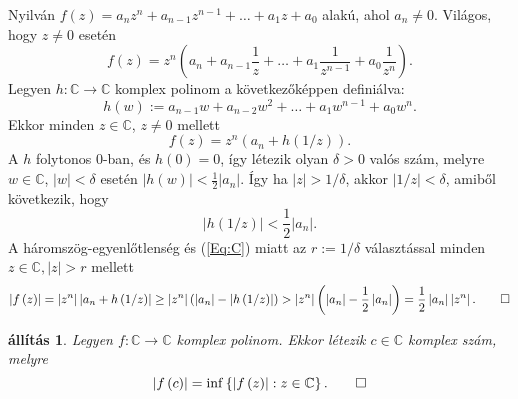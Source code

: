 \documentclass[9pt, showtrims]{memoir}
\makeatletter
\renewenvironment{proof}[1][\proofname]
    {\par\pushQED{\qed}%
    \normalfont \topsep6\p@\@plus6\p@\relax
    \trivlist
    \item[\hskip\labelsep
        \itshape
    #1\@addpunct{:}]\ignorespaces}
    {\popQED\endtrivlist\@endpefalse}
\theoremstyle{plain}
\newtheorem{proposition}{állítás}[section]
\theoremstyle{remark}
\theoremstyle{definition}
\makeatother
\begin{document}
\begin{proof}
Nyilván $f\left( z\right) =a_{n}z^{n}+a_{n-1}z^{n-1}+\ldots +a_{1}z+a_{0}
$ alakú, ahol $a_{n}\neq 0$.
Világos, hogy $z\neq 0$ esetén 
\[
f\left( z\right) =z^{n}\left( a_{n}+a_{n-1}\frac{1}{z}+\ldots +a_{1}\frac{1}{z^{n-1}}+a_{0}\frac{1}{z^{n}}\right) \text{.}
\]
Legyen $h:\mathbb{C}\rightarrow \mathbb{C}$ komplex polinom a következőképpen definiálva: 
\[
h\left( w\right) :=a_{n-1}w+a_{n-2}w^{2}+\ldots +a_{1}w^{n-1}+a_{0}w^{n}.
\]
Ekkor minden $z\in \mathbb{C}$, $z\neq 0$ mellett 
\begin{equation}
f\left( z\right) =z^{n}\left( a_{n}+h\left( 1/z\right) \right) .
\label{Eq:C}
\end{equation}
A $h$ folytonos $0$-ban, és $h\left( 0\right) =0$, így létezik
olyan $\delta >0$ valós szám, melyre $w\in \mathbb{C}$, $\left|
w\right| <\delta $ esetén $\left| h\left( w\right) \right| <\frac{1}{2}\left| a_{n}\right| $.
\'{I}gy ha $\left| z\right| >1/\delta $, akkor $\left| 1/z\right| <\delta $, amiből következik, hogy 
\[
\left| h\left( 1/z\right) \right| <\frac{1}{2}\left| a_{n}\right| .
\]
A háromszög-egyenlőtlenség és (\ref{Eq:C}) miatt 
az $r:=1/\delta $ választással minden 
$z\in \mathbb{C},\left| z\right| >r$ mellett 
\[
\left| f\left( z\right) \right|  
=
\left| z^{n}\right| \left| a_{n}+h\left(1/z\right) \right| \geq \left| z^{n}\right| \left( \left| a_{n}\right|
-\left| h\left( 1/z\right) \right| \right) 
> 
\left| z^{n}\right| \left( \left| a_{n}\right| -\frac{1}{2}\left|
a_{n}\right| \right) =\frac{1}{2}\left| a_{n}\right| \left| z^{n}\right| .\qedhere
\]
\end{proof}

\begin{proposition}
\label{Th:Cauchy1}Legyen $f:\mathbb{C}\rightarrow \mathbb{C}$ komplex polinom.
Ekkor létezik $c\in \mathbb{C}$ komplex szám, melyre 
\[
\left| f\left( c\right) \right| =\inf \left\{ \left| f\left( z\right)
\right| :z\in \mathbb{C}\right\} .\qedhere
\]
\end{proposition}
\end{document}
